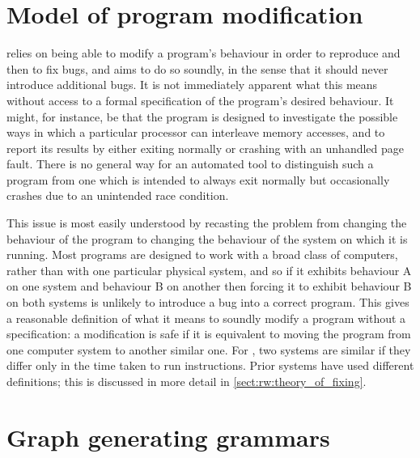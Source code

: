 \section{Model of program modification}
\label{sect:intro:theory_of_fixing}

{\Technique} relies on being able to modify a program's behaviour in
order to reproduce and then to fix bugs, and aims to do so soundly, in
the sense that it should never introduce additional bugs.  It is not
immediately apparent what this means without access to a formal
specification of the program's desired behaviour.  It might, for
instance, be that the program is designed to investigate the possible
ways in which a particular processor can interleave memory accesses,
and to report its results by either exiting normally or crashing with
an unhandled page fault.  There is no general way for an automated
tool to distinguish such a program from one which is intended to
always exit normally but occasionally crashes due to an unintended
race condition.

This issue is most easily understood by recasting the problem from
changing the behaviour of the program to changing the behaviour of the
system on which it is running.  Most programs are designed to work
with a broad class of computers, rather than with one particular
physical system, and so if it exhibits behaviour A on one system and
behaviour B on another then forcing it to exhibit behaviour B on both
systems is unlikely to introduce a bug into a correct program.  This
gives a reasonable definition of what it means to soundly modify a
program without a specification: a modification is safe if it is
equivalent to moving the program from one computer system to another
similar one.  For {\technique}, two systems are similar if they differ
only in the time taken to run instructions.  Prior systems have used
different definitions; this is discussed in more detail in
\autoref{sect:rw:theory_of_fixing}.

\section{Graph generating grammars}

\label{sect:intro:graph_grammar}

